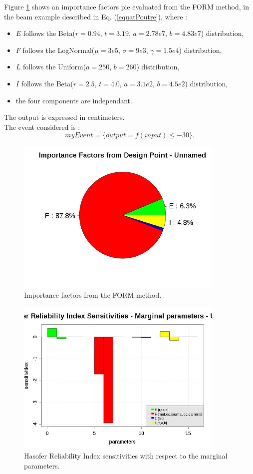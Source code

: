 Figure \ref{FORMImportanceFactors}  shows an importance factors pie evaluated from the FORM method, in the beam example described in Eq. (\ref{equatPoutre}), where :
\begin{itemize}
\item $E$ follows the Beta($r = 0.94$, $t = 3.19$, $a = 2.78e7$, $b = 4.83e7$) distribution,
\item $F$ follows the LogNormal($\mu = 3e5$, $\sigma = 9e3$, $\gamma = 1.5e4$)  distribution,
\item $L$ follows the Uniform($a = 250$, $b=260$) distribution,
\item $I$ follows the Beta($r = 2.5$, $t = 4.0$, $a = 3.1e2$, $b = 4.5e2$) distribution,
\item the four components are independant.
\end{itemize}

The output is expressed in centimeters.\\
The event considered is :
$$
myEvent = \{ output=f(input) \leq -30 \}.
$$
\begin{figure}[H]
  \begin{center}
    \includegraphics[width=10cm]{ImportanceFactorsDrawingFORM.png}
  \end{center}
  \caption{Importance factors from the FORM method.}
  \label{FORMImportanceFactors}
\end{figure}

\begin{figure}[H]
  \begin{center}
    \includegraphics[width=10cm]{HasoferReliabilityIndexMarginalSensitivityDrawing.png}
  \end{center}
  \caption{Hasofer Reliability Index sensitivities with respect to the marginal parameters.}
  \label{FORMIndexSensitivity}
\end{figure}

